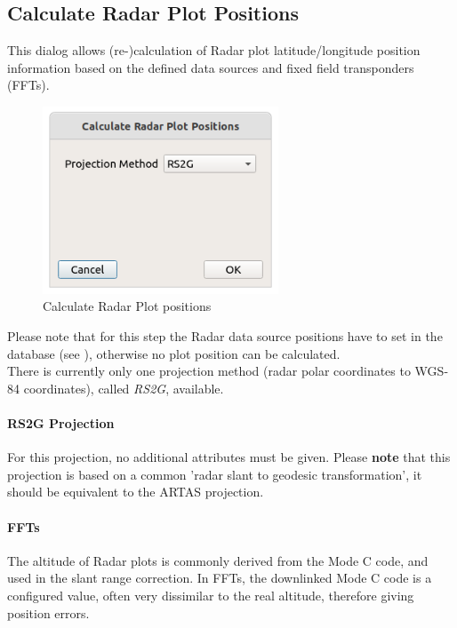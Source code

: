 \subsection{Calculate Radar Plot Positions}
\label{sec:ui_proc_radar_plot_pos}

This dialog allows (re-)calculation of Radar plot latitude/longitude position information based on the defined data sources and fixed field transponders (FFTs).

\begin{figure}[H]
  \center
    \includegraphics[width=7cm]{figures/proc_calc_radar.png}
  \caption{Calculate Radar Plot positions}
\end{figure}

Please note that for this step the Radar data source positions have to set in the database (see ), otherwise no plot position can be calculated.  \\

There is currently only one projection method (radar polar coordinates to WGS-84 coordinates), called \textit{RS2G}, available. 

\paragraph{RS2G Projection}

For this projection, no additional attributes must be given. Please \textbf{note} that this projection is based on a common 'radar slant to geodesic transformation', it should be equivalent to the ARTAS projection. 

\paragraph{FFTs}

The altitude of Radar plots is commonly derived from the Mode C code, and used in the slant range correction. In FFTs, the downlinked Mode C code is a configured value, often very dissimilar to the real altitude, therefore giving position errors. \\

